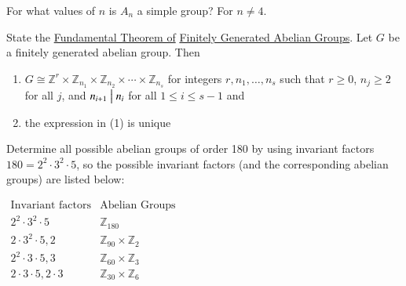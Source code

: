 \documentclass[avery5371,grid]{flashcards}
\newcommand{\Z}{\mathbb{Z}}
\newcommand{\divides}{\bigm|}
\begin{document}
\begin{flashcard}[Groups]{For what values of $n$ is $A_n$ a simple group?}
 For $n \not=4$.
\end{flashcard}

\begin{flashcard}[Groups]{State the \underline{Fundamental Theorem of} \underline{Finitely Generated Abelian Groups}.}
 Let $G$ be a finitely generated abelian group. Then
 \begin{enumerate}
      \item $G \cong \Z^r \times \Z_{n_1} \times \Z_{n_2} \times \cdots \times \Z_{n_s}$ for integers $r, n_1, \ldots, n_s$ such that $r \geq 0$, $n_j \geq 2$ for all $j$, and $n_{i+1} \divides n_i$ for all $1 \leq i \leq s-1$ and
      \item the expression in (1) is unique
 \end{enumerate}
\end{flashcard}

\begin{flashcard}[Groups]{Determine all possible abelian groups of order 180 by using invariant factors}
 $180 = 2^2 \cdot 3^2 \cdot 5$, so the possible invariant factors (and the corresponding abelian groups) are listed below:
 \begin{center} $\begin{array}{c|c}
      \text{Invariant factors} & \text{Abelian Groups} \\
      \hline
      2^2 \cdot 3^2 \cdot 5 & \Z_{180} \\
      2 \cdot 3^2 \cdot 5, 2 & \Z_{90} \times \Z_2 \\
      2^2 \cdot 3 \cdot 5, 3 & \Z_{60} \times \Z_3 \\
      2 \cdot 3 \cdot 5, 2 \cdot 3 & \Z_{30} \times \Z_6 \\
 \end{array}$ \end{center}
\end{flashcard}
\end{document}
